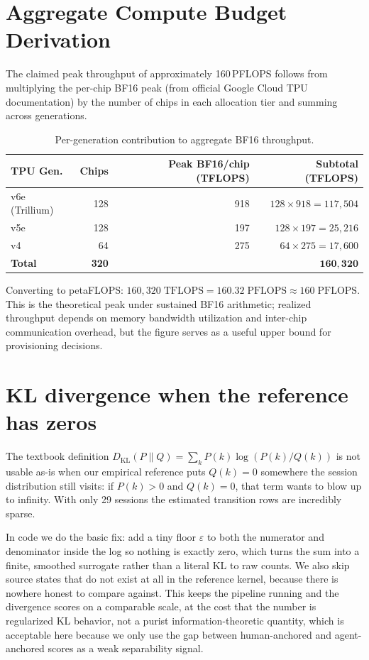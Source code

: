 \documentclass[12pt,letterpaper]{article}
\begin{document}
\section{Aggregate Compute Budget Derivation}
\label{app:compute_budget}

The claimed peak throughput of approximately 160\,PFLOPS follows from multiplying the per-chip BF16 peak (from official Google Cloud TPU documentation) by the number of chips in each allocation tier and summing across generations.

\begin{table}[ht]
\centering
\caption{Per-generation contribution to aggregate BF16 throughput.}
\label{tab:compute_derivation}
\begin{tabular}{@{}lrrr@{}}
\toprule
\textbf{TPU Gen.} & \textbf{Chips} & \textbf{Peak BF16/chip (TFLOPS)} & \textbf{Subtotal (TFLOPS)} \\
\midrule
v6e (Trillium) & 128 & 918 & $128 \times 918 = 117{,}504$ \\
v5e            & 128 & 197 & $128 \times 197 = 25{,}216$  \\
v4             &  64 & 275 & $64  \times 275 = 17{,}600$  \\
\midrule
\textbf{Total} & \textbf{320} & & $\mathbf{160{,}320}$ \\
\bottomrule
\end{tabular}
\end{table}

Converting to petaFLOPS: $160{,}320\;\text{TFLOPS} = 160.32\;\text{PFLOPS} \approx 160\;\text{PFLOPS}$. This is the theoretical peak under sustained BF16 arithmetic; realized throughput depends on memory bandwidth utilization and inter-chip communication overhead, but the figure serves as a useful upper bound for provisioning decisions.



\section{KL divergence when the reference has zeros}
\label{app:kl_zeros}

The textbook definition $D_{\mathrm{KL}}(P\parallel Q)=\sum_k P(k)\log(P(k)/Q(k))$ is not usable as-is when our empirical reference puts $Q(k)=0$ somewhere the session distribution still visits: if $P(k)>0$ and $Q(k)=0$, that term wants to blow up to infinity. With only 29 sessions the estimated transition rows are incredibly sparse.

In code we do the basic fix: add a tiny floor $\varepsilon$ to both the numerator and denominator inside the log so nothing is exactly zero, which turns the sum into a finite, smoothed surrogate rather than a literal KL to raw counts. We also skip source states that do not exist at all in the reference kernel, because there is nowhere honest to compare against. This keeps the pipeline running and the divergence scores on a comparable scale, at the cost that the number is regularized KL behavior, not a purist information-theoretic quantity, which is acceptable here because we only use the gap between human-anchored and agent-anchored scores as a weak separability signal.
\end{document}
